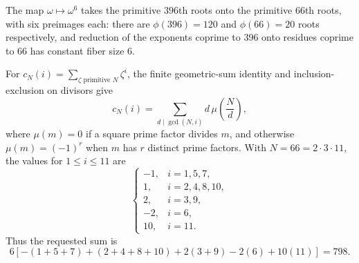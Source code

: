 The map $\omega\mapsto\omega^6$ takes the primitive $396$th roots onto the primitive $66$th roots, with six preimages each: there are $\phi(396)=120$ and $\phi(66)=20$ roots respectively, and reduction of the exponents coprime to $396$ onto residues coprime to $66$ has constant fiber size $6$.

For $c_N(i)=\sum_{\zeta\text{ primitive }N}\zeta^i$, the finite geometric-sum identity and inclusion-exclusion on divisors give
\[
c_N(i)=\sum_{d\mid\gcd(N,i)}d\,\mu(\dfrac{N}{d}),
\]
where $\mu(m)=0$ if a square prime factor divides $m$, and otherwise $\mu(m)=(-1)^r$ when $m$ has $r$ distinct prime factors. With $N=66=2\cdot3\cdot11$, the values for $1\le i\le11$ are
\[
\begin{cases}
-1,&i=1,5,7,\\
1,&i=2,4,8,10,\\
2,&i=3,9,\\
-2,&i=6,\\
10,&i=11.
\end{cases}
\]
Thus the requested sum is
\[
6[-(1+5+7)+(2+4+8+10)+2(3+9)-2(6)+10(11)]
=\boxed{798}.
\]
